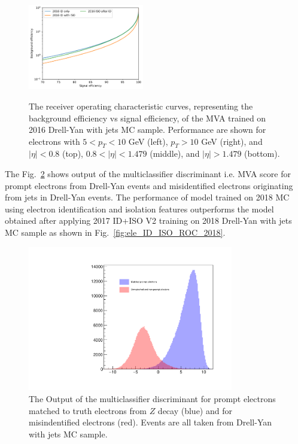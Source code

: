 \begin{figure}[!htb]
\begin{center}
      \includegraphics[width=0.45\textwidth]{Figures/Electrons/2016_EE_10_.pdf} \\
   \caption{The receiver operating characteristic curves, representing the background efficiency vs signal efficiency, of the MVA trained on 2016 Drell-Yan with
   jets MC sample. Performance are shown for electrons with $5 < p_T < 10 $ GeV (left), $p_T > 10$ GeV (right), and $|\eta| < 0.8$ (top),
   $0.8 < |\eta| < 1.479$ (middle), and $|\eta| > 1.479$ (bottom).
   \label{fig:ele_ID_ISO_ROC_2016_}}
   \end{center}
\end{figure}

The Fig.~\ref{fig:ele_MVA_score_2018} shows output of the multiclassifier discriminant i.e. MVA score for prompt electrons from Drell-Yan events and
misidentified electrons originating from jets in Drell-Yan events. The performance of  model trained on 2018 MC using electron identification and isolation
features outperforms the model obtained after applying 2017 ID+ISO V2 training on 2018 Drell-Yan with jets MC sample as shown in Fig.~\ref{fig:ele_ID_ISO_ROC_2018}.

\begin{figure}[!htb]
   \vspace*{0.3cm}
   \begin{center}
      \includegraphics[width=0.80\textwidth]{Figures/Electrons/Ele_BDTv2_Score.pdf}
      \caption{The Output of the multiclassifier discriminant for prompt electrons matched to truth electrons from $Z$ decay (blue) and for misindentified
      electrons (red). Events are all taken from Drell-Yan with jets MC sample.
      \label{fig:ele_MVA_score_2018}}
   \end{center}
\end{figure}

